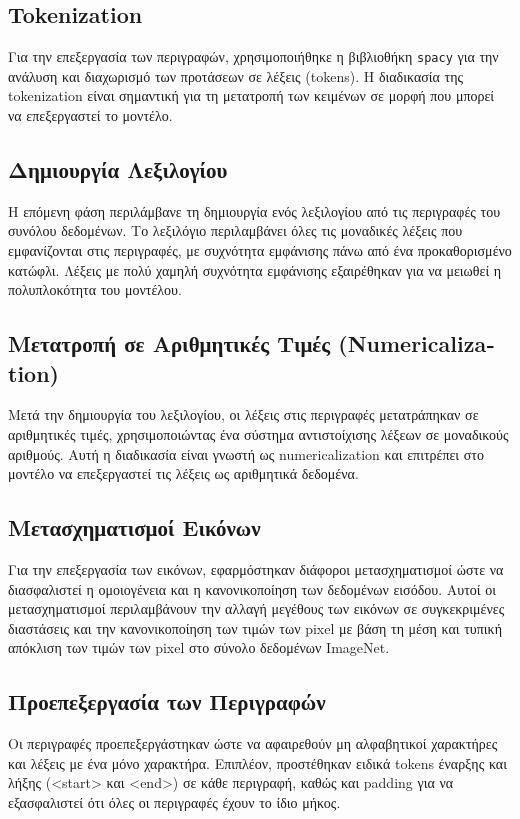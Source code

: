 \documentclass[conference]{IEEEtran}
\begin{document}
\subsection{\textlatin{Tokenization}}
Για την επεξεργασία των περιγραφών, χρησιμοποιήθηκε η βιβλιοθήκη \textlatin{\texttt{spacy}} για την ανάλυση και διαχωρισμό των προτάσεων σε λέξεις \textlatin{(tokens)}. Η διαδικασία της tokenization είναι σημαντική για τη μετατροπή των κειμένων σε μορφή που μπορεί να επεξεργαστεί το μοντέλο.

\subsection{Δημιουργία Λεξιλογίου}
Η επόμενη φάση περιλάμβανε τη δημιουργία ενός λεξιλογίου από τις περιγραφές του συνόλου δεδομένων. Το λεξιλόγιο περιλαμβάνει όλες τις μοναδικές λέξεις που εμφανίζονται στις περιγραφές, με συχνότητα εμφάνισης πάνω από ένα προκαθορισμένο κατώφλι. Λέξεις με πολύ χαμηλή συχνότητα εμφάνισης εξαιρέθηκαν για να μειωθεί η πολυπλοκότητα του μοντέλου.

\subsection{Μετατροπή σε Αριθμητικές Τιμές \textlatin{(Numericalization)}}
Μετά την δημιουργία του λεξιλογίου, οι λέξεις στις περιγραφές μετατράπηκαν σε αριθμητικές τιμές, χρησιμοποιώντας ένα σύστημα αντιστοίχισης λέξεων σε μοναδικούς αριθμούς. Αυτή η διαδικασία είναι γνωστή ως \textlatin{numericalization} και επιτρέπει στο μοντέλο να επεξεργαστεί τις λέξεις ως αριθμητικά δεδομένα.

\subsection{Μετασχηματισμοί Εικόνων}
Για την επεξεργασία των εικόνων, εφαρμόστηκαν διάφοροι μετασχηματισμοί ώστε να διασφαλιστεί η ομοιογένεια και η κανονικοποίηση των δεδομένων εισόδου. Αυτοί οι μετασχηματισμοί περιλαμβάνουν την αλλαγή μεγέθους των εικόνων σε συγκεκριμένες διαστάσεις και την κανονικοποίηση των τιμών των pixel με βάση τη μέση και τυπική απόκλιση των τιμών των pixel στο σύνολο δεδομένων \textlatin{ImageNet}.

\subsection{Προεπεξεργασία των Περιγραφών}
Οι περιγραφές προεπεξεργάστηκαν ώστε να αφαιρεθούν μη αλφαβητικοί χαρακτήρες και λέξεις με ένα μόνο χαρακτήρα. Επιπλέον, προστέθηκαν ειδικά tokens έναρξης και λήξης (<\textlatin{start}> και <\textlatin{end}>) σε κάθε περιγραφή, καθώς και padding για να εξασφαλιστεί ότι όλες οι περιγραφές έχουν το ίδιο μήκος.
\end{document}
